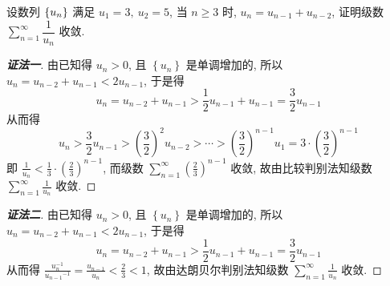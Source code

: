 \begin{example}
    设数列 $\qty{u_n}$ 满足 $u_1=3,~u_2=5$, 当 $n\geqslant 3$ 时, $u_n=u_{n-1}+u_{n-2}$, 证明级数 $\displaystyle \sum_{n=1}^{\infty} \dfrac{1}{u_n}$ 收敛.
\end{example}
\begin{proof}[{\songti \textbf{证法一}}]
    由已知得 $ u_{n}>0 $, 且 $ \left\{u_{n}\right\} $ 是单调增加的, 所以 $ u_{n}=u_{n-2}+u_{n-1}<   2 u_{n-1} $, 于是得 $$\displaystyle  u_{n}=u_{n-2}+u_{n-1}>\frac{1}{2} u_{n-1}+u_{n-1}=\frac{3}{2} u_{n-1} $$ 从而得 $$\displaystyle  u_{n}>\frac{3}{2} u_{n-1}>   \left(\frac{3}{2}\right)^{2} u_{n-2}>\cdots>\left(\frac{3}{2}\right)^{n-1} u_{1}=3 \cdot\left(\frac{3}{2}\right)^{n-1} $$ 即 $\displaystyle  \frac{1}{u_{n}}<\frac{1}{3} \cdot\left(\frac{2}{3}\right)^{n-1} $, 而级数 $\displaystyle  \sum_{n=1}^{\infty}\left(\frac{2}{3}\right)^{n-1} $ 收敛, 故由比较判别法知级数 $\displaystyle  \sum_{n=1}^{\infty} \frac{1}{u_{n}} $ 收敛.
\end{proof}
\begin{proof}[{\songti \textbf{证法二}}]
    由已知得 $ u_{n}>0 $, 且 $ \left\{u_{n}\right\} $ 是单调增加的, 所以 $ u_{n}=u_{n-2}+u_{n-1}<   2 u_{n-1} $, 于是得 $$\displaystyle  u_{n}=u_{n-2}+u_{n-1}>\frac{1}{2} u_{n-1}+u_{n-1}=\frac{3}{2} u_{n-1} $$ 从而得 $\displaystyle  \frac{u_{n}^{-1}}{u_{n-1}{ }^{-1}}=\frac{u_{n-1}}{u_{n}}<\frac{2}{3}<1$, 故由达朗贝尔判别法知级数 $\displaystyle  \sum_{n=1}^{\infty} \frac{1}{u_{n}} $ 收敛.
\end{proof}

